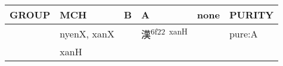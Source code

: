 \documentclass[14pt,a4paper]{scrartcl}
\begin{document}
\begin{longtable}[c]{@{}llllll@{}}
\toprule
\begin{minipage}[b]{0.14\columnwidth}\raggedright\strut
GROUP
\strut\end{minipage} &
\begin{minipage}[b]{0.14\columnwidth}\raggedright\strut
MCH
\strut\end{minipage} &
\begin{minipage}[b]{0.14\columnwidth}\raggedright\strut
B
\strut\end{minipage} &
\begin{minipage}[b]{0.14\columnwidth}\raggedright\strut
A
\strut\end{minipage} &
\begin{minipage}[b]{0.14\columnwidth}\raggedright\strut
none
\strut\end{minipage} &
\begin{minipage}[b]{0.14\columnwidth}\raggedright\strut
PURITY
\strut\end{minipage}\tabularnewline
\midrule
\endhead
\begin{minipage}[t]{0.14\columnwidth}\raggedright\strut
𩁢
\strut\end{minipage} &
\begin{minipage}[t]{0.14\columnwidth}\raggedright\strut
nyenX, xanX
\strut\end{minipage} &
\begin{minipage}[t]{0.14\columnwidth}\raggedright\strut
\strut\end{minipage} &
\begin{minipage}[t]{0.14\columnwidth}\raggedright\strut
漢\textsuperscript{6f22~xanH}
\strut\end{minipage} &
\begin{minipage}[t]{0.14\columnwidth}\raggedright\strut
\strut\end{minipage} &
\begin{minipage}[t]{0.14\columnwidth}\raggedright\strut
pure:A
\strut\end{minipage}\tabularnewline
\begin{minipage}[t]{0.14\columnwidth}\raggedright\strut
𡏳
\strut\end{minipage} &
\begin{minipage}[t]{0.14\columnwidth}\raggedright\strut
xanH
\strut\end{minipage} &
\begin{minipage}[t]{0.14\columnwidth}\raggedright\strut
\strut\end{minipage} &
\begin{minipage}[t]{0.14\columnwidth}\raggedright\strut

\end{minipage}
\end{longtable}
\end{document}
